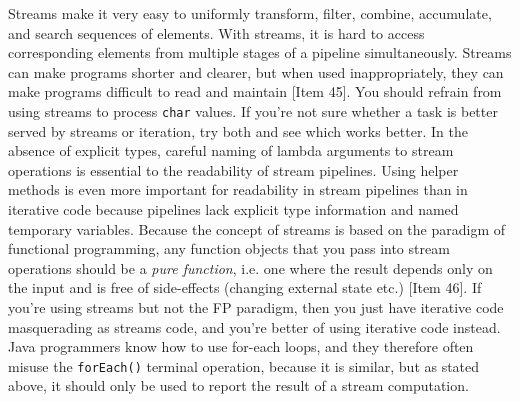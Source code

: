 \documentclass[8pt, table, xcdraw]{article}%
\begin{document}
Streams make it very easy to uniformly transform, filter, combine, accumulate, and search sequences of elements. With streams, it is hard to access corresponding elements from multiple stages of a pipeline simultaneously. Streams can make programs shorter and clearer, but when used inappropriately, they can make programs difficult to read and maintain [Item 45]. You should refrain from using streams to process \lstinline{char} values. If you’re not sure whether a task is better served by streams or iteration, try both and see which works better. In the absence of explicit types, careful naming of lambda arguments to stream operations is essential to the readability of stream pipelines. Using helper methods is even more important for readability in stream pipelines than in iterative code because pipelines lack explicit type information and named temporary variables. Because the concept of streams is based on the paradigm of functional programming, any function objects that you pass into stream operations should be a \emph{pure function}, i.e. one where the result depends only on the input and is free of side-effects (changing external state etc.) [Item 46]. If you're using streams but not the FP paradigm, then you just have iterative code masquerading as streams code, and you're better of using iterative code instead. Java programmers know how to use for-each loops, and they therefore often misuse the \lstinline{forEach()} terminal operation, because it is similar, but as stated above, it should only be used to report the result of a stream computation.
\end{document}
